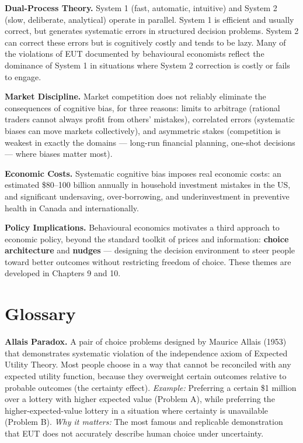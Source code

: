 \documentclass[12pt, letterpaper]{article}
\begin{document}
\textbf{Dual-Process Theory.} System 1 (fast, automatic, intuitive) and System 2 (slow, deliberate, analytical) operate in parallel. System 1 is efficient and usually correct, but generates systematic errors in structured decision problems. System 2 can correct these errors but is cognitively costly and tends to be lazy. Many of the violations of EUT documented by behavioural economists reflect the dominance of System 1 in situations where System 2 correction is costly or fails to engage.

\textbf{Market Discipline.} Market competition does not reliably eliminate the consequences of cognitive bias, for three reasons: limits to arbitrage (rational traders cannot always profit from others' mistakes), correlated errors (systematic biases can move markets collectively), and asymmetric stakes (competition is weakest in exactly the domains --- long-run financial planning, one-shot decisions --- where biases matter most).

\textbf{Economic Costs.} Systematic cognitive bias imposes real economic costs: an estimated \$80--100 billion annually in household investment mistakes in the US, and significant undersaving, over-borrowing, and underinvestment in preventive health in Canada and internationally.

\textbf{Policy Implications.} Behavioural economics motivates a third approach to economic policy, beyond the standard toolkit of prices and information: \textbf{choice architecture} and \textbf{nudges} --- designing the decision environment to steer people toward better outcomes without restricting freedom of choice. These themes are developed in Chapters 9 and 10.

\medskip


\section*{Glossary}


\textbf{Allais Paradox.} A pair of choice problems designed by Maurice Allais (1953) that demonstrates systematic violation of the independence axiom of Expected Utility Theory. Most people choose in a way that cannot be reconciled with any expected utility function, because they overweight certain outcomes relative to probable outcomes (the certainty effect). \textit{Example:} Preferring a certain \$1 million over a lottery with higher expected value (Problem A), while preferring the higher-expected-value lottery in a situation where certainty is unavailable (Problem B). \textit{Why it matters:} The most famous and replicable demonstration that EUT does not accurately describe human choice under uncertainty.
\end{document}
